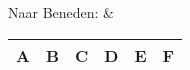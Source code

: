 Naar Beneden: &
\begin{tabular}{|c|c|c|c|c|c|}
	\hline 
	\textbf{A} & \textbf{B} & \textbf{C} & \textbf{D} & \textbf{E} & \textbf{F}\\
	\hline 
\end{tabular} \\